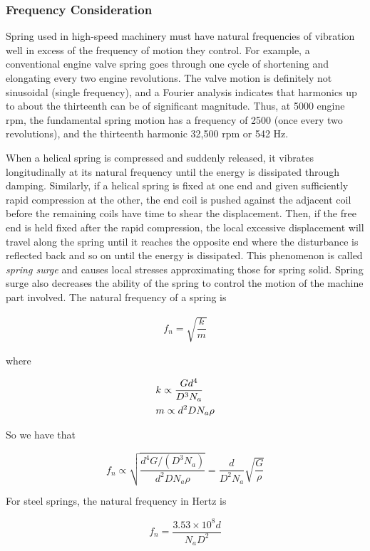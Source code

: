 \documentclass[a4paper,openany,nobib]{tufte-book}
\begin{document}
{{\subsubsection{Frequency Consideration}
\label{frequency-consideration}
Spring used in high-speed machinery must have natural frequencies of
vibration well in excess of the frequency of motion they control. For
example, a conventional engine valve spring goes through one cycle of
shortening and elongating every two engine revolutions. The valve motion
is definitely not sinusoidal (single frequency), and a Fourier analysis
indicates that harmonics up to about the thirteenth can be of
significant magnitude. Thus, at 5000 engine rpm, the fundamental spring
motion has a frequency of 2500 (once every two revolutions), and the
thirteenth harmonic 32,500 rpm or 542 Hz.

When a helical spring is compressed and suddenly released, it vibrates
longitudinally at its natural frequency until the energy is dissipated
through damping. Similarly, if a helical spring is fixed at one end and
given sufficiently rapid compression at the other, the end coil is
pushed against the adjacent coil before the remaining coils have time to
shear the displacement. Then, if the free end is held fixed after the
rapid compression, the local excessive displacement will travel along
the spring until it reaches the opposite end where the disturbance is
reflected back and so on until the energy is dissipated. This phenomenon
is called \emph{spring surge} and causes local stresses approximating those
for spring solid. Spring surge also decreases the ability of the spring
to control the motion of the machine part involved. The natural
frequency of a spring is

$$\begin{gathered}
    f_n = \sqrt {\dfrac{k}{m}}
  \end{gathered}$$

where

$$\begin{gathered}
    k \propto \frac{Gd^4}{D^3N_a} \hfill \\
    m \propto d^2DN_a\rho  \hfill
\end{gathered}$$

So we have that

$$f_n \propto \sqrt {\frac{d^4G/(D^3N_a)}{d^2DN_a\rho }}  = \frac{d}{D^2N_a}\sqrt {\frac{G}{\rho }}$$

For steel springs, the natural frequency in Hertz is

$$f_n = \frac{3.53 \times 10^8d}{N_aD^2}$$

}}
\end{document}
